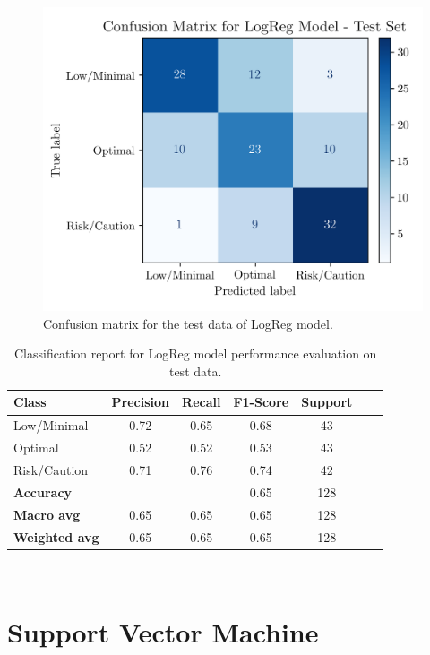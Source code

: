 \documentclass[conference]{IEEEtran}
\begin{document}
\begin{figure}[H]
    \centering
    \includegraphics[width=1\linewidth]{assets/LOGR_confmatTest.png}
    \caption{Confusion matrix for the test data of LogReg model.}
    \label{cm_Test_LogReg}
\end{figure} %

\begin{table}[H]
\centering
\caption{Classification report for LogReg model performance evaluation on test data.}
\label{crTestLogREg}
\begin{tabular}{lcccccc}
\toprule
\textbf{Class} & \textbf{Precision} & \textbf{Recall} & \textbf{F1-Score} & \textbf{Support} \\
\midrule
Low/Minimal & 0.72 & 0.65 & 0.68 & 43 \\
Optimal & 0.52 & 0.52 & 0.53 & 43 \\
Risk/Caution & 0.71 & 0.76 & 0.74 & 42 \\
\midrule
\textbf{Accuracy} &  &  & 0.65 & 128 \\
\textbf{Macro avg} & 0.65 & 0.65 & 0.65 & 128 \\
\textbf{Weighted avg} & 0.65 & 0.65 & 0.65 & 128 \\
\bottomrule
\end{tabular}
\end{table} %

$\ $

\section{Support Vector Machine}
\end{document}
